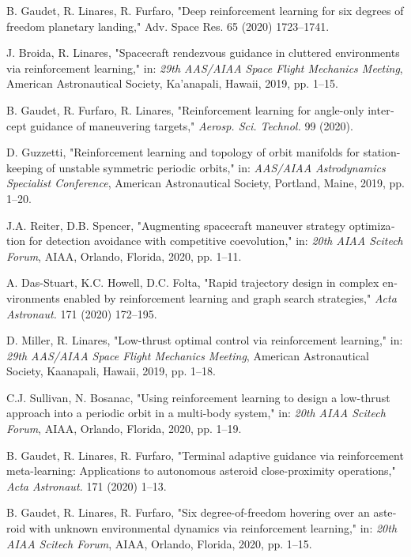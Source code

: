 \documentclass[a4paper]{article}
\begin{document}
\begin{latin}
\begin{thebibliography}{1}
		B. Gaudet, R. Linares, R. Furfaro,
		"Deep reinforcement learning for six degrees of freedom planetary landing,"
		Adv. Space Res. 65 (2020) 1723–1741.
		
		J. Broida, R. Linares,
		"Spacecraft rendezvous guidance in cluttered environments via reinforcement learning,"
		in: \textit{29th AAS/AIAA Space Flight Mechanics Meeting}, American Astronautical Society, Ka’anapali, Hawaii, 2019, pp. 1–15.
		
		B. Gaudet, R. Furfaro, R. Linares,
		"Reinforcement learning for angle-only intercept guidance of maneuvering targets,"
		\textit{Aerosp. Sci. Technol.} 99 (2020).
		
		D. Guzzetti,
		"Reinforcement learning and topology of orbit manifolds for station-keeping of unstable symmetric periodic orbits,"
		in: \textit{AAS/AIAA Astrodynamics Specialist Conference}, American Astronautical Society, Portland, Maine, 2019, pp. 1–20.
		
		J.A. Reiter, D.B. Spencer,
		"Augmenting spacecraft maneuver strategy optimization for detection avoidance with competitive coevolution,"
		in: \textit{20th AIAA Scitech Forum}, AIAA, Orlando, Florida, 2020, pp. 1–11.
		
		A. Das-Stuart, K.C. Howell, D.C. Folta,
		"Rapid trajectory design in complex environments enabled by reinforcement learning and graph search strategies,"
		\textit{Acta Astronaut.} 171 (2020) 172–195.
		
		D. Miller, R. Linares,
		"Low-thrust optimal control via reinforcement learning,"
		in: \textit{29th AAS/AIAA Space Flight Mechanics Meeting}, American Astronautical Society, Kaanapali, Hawaii, 2019, pp. 1–18.
		
		C.J. Sullivan, N. Bosanac,
		"Using reinforcement learning to design a low-thrust approach into a periodic orbit in a multi-body system,"
		in: \textit{20th AIAA Scitech Forum}, AIAA, Orlando, Florida, 2020, pp. 1–19.
		
		
		B. Gaudet, R. Linares, R. Furfaro,
		"Terminal adaptive guidance via reinforcement meta-learning: Applications to autonomous asteroid close-proximity operations,"
		\textit{Acta Astronaut.} 171 (2020) 1–13.
		
		
		B. Gaudet, R. Linares, R. Furfaro,
		"Six degree-of-freedom hovering over an asteroid with unknown environmental dynamics via reinforcement learning,"
		in: \textit{20th AIAA Scitech Forum}, AIAA, Orlando, Florida, 2020, pp. 1–15.
		

\end{thebibliography}
\end{latin}
\end{document}
